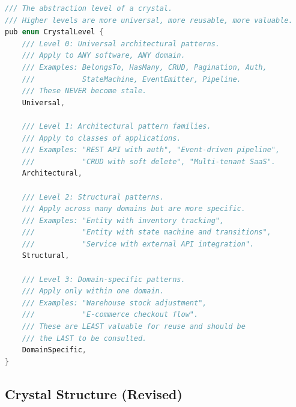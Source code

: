 \documentclass[11pt,a4paper]{article}
\begin{document}
\begin{lstlisting}[language=C]
/// The abstraction level of a crystal.
/// Higher levels are more universal, more reusable, more valuable.
pub enum CrystalLevel {
    /// Level 0: Universal architectural patterns.
    /// Apply to ANY software, ANY domain.
    /// Examples: BelongsTo, HasMany, CRUD, Pagination, Auth,
    ///           StateMachine, EventEmitter, Pipeline.
    /// These NEVER become stale.
    Universal,

    /// Level 1: Architectural pattern families.
    /// Apply to classes of applications.
    /// Examples: "REST API with auth", "Event-driven pipeline",
    ///           "CRUD with soft delete", "Multi-tenant SaaS".
    Architectural,

    /// Level 2: Structural patterns.
    /// Apply across many domains but are more specific.
    /// Examples: "Entity with inventory tracking",
    ///           "Entity with state machine and transitions",
    ///           "Service with external API integration".
    Structural,

    /// Level 3: Domain-specific patterns.
    /// Apply only within one domain.
    /// Examples: "Warehouse stock adjustment",
    ///           "E-commerce checkout flow".
    /// These are LEAST valuable for reuse and should be
    /// the LAST to be consulted.
    DomainSpecific,
}
\end{lstlisting}

\subsection{Crystal Structure (Revised)}
\end{document}
